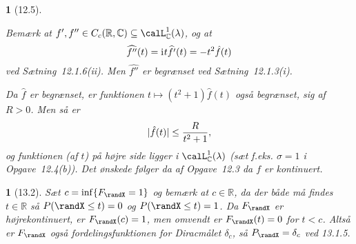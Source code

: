 \documentclass[a4paper, 11pt, article, danish, oneside]{memoir}
\title{\doctitle}
\author{\docauthor}
\newcommand{\reals}{\mathbb{R}}
\newcommand{\complex}{\mathbb{C}}
\newcommand{\blank}{\mathrel{\;\cdot\;}}
\newcommand{\blankifempty}[1]{\ifstrempty{#1}{\blank}{#1}}
\DeclarePairedDelimiter{\auxdelimlvert}{\lvert}{\rvert}
\newcommand{\abs}[2][]{\auxdelimlvert[#1]{\blankifempty{#2}}}
\newcommand{\iu}{\mathrm{i}\mkern1mu}
\newcommand{\pencilsymbol}{\raisebox{-2pt}{\normalfont\PencilLeft}}
\theoremstyle{changedotcustomnumber}
\newtheorem{opgave}{\pencilsymbol}
\theoremstyle{changedotbreakcustomnumber}
\newtheorem{opgavebreak}{\pencilsymbol}
\begin{document}
\maketitle


\begin{opgavebreak}[12.5]
\begin{solutionsec}
    \item Bemærk at $f',f'' \in C_c(\reals,\complex) \subseteq \calL^1_\complex(\lambda)$, og at
    \begin{equation*}
        \widehat{f''}(t)
            = \iu t \widehat{f'}(t)
            = - t^2 \hat{f}(t)
    \end{equation*}
    ved Sætning~12.1.6(ii). Men $\widehat{f''}$ er begrænset ved Sætning~12.1.3(i).

    \item Da $\hat{f}$ er begrænset, er funktionen $t \mapsto (t^2+1) \hat{f}(t)$ også begrænset, sig af $R > 0$. Men så er
    \begin{equation*}
        \abs{\hat{f}(t)}
            \leq \frac{R}{t^2+1},
    \end{equation*}
    og funktionen (af $t$) på højre side ligger i $\calL^1_\complex(\lambda)$ (sæt f.eks. $\sigma = 1$ i Opgave~12.4(b)). Det ønskede følger da af Opgave~12.3 da $f$ er kontinuert.
\end{solutionsec}
\end{opgavebreak}


\begin{opgave}[13.2]
    Sæt $c = \inf \{F_\randX = 1\}$ og bemærk at $c \in \reals$, da der både må findes $t \in \reals$ så $P(\randX \leq t) = 0$ og $P(\randX \leq t) = 1$. Da $F_\randX$ er højrekontinuert, er $F_\randX(c) = 1$, men omvendt er $F_\randX(t) = 0$ for $t < c$. Altså er $F_\randX$ også fordelingsfunktionen for Diracmålet $\delta_c$, så $P_\randX = \delta_c$ ved 13.1.5.
\end{opgave}
\end{document}
